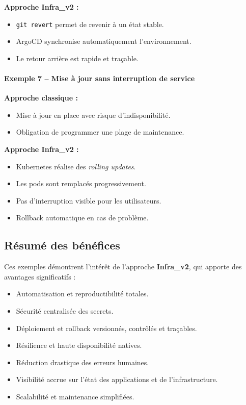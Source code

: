 \textbf{Approche Infra\_v2 :}
\begin{itemize}
	\item \texttt{git revert} permet de revenir à un état stable.
	\item ArgoCD synchronise automatiquement l’environnement.
	\item Le retour arrière est rapide et traçable.
\end{itemize}

\paragraph{Exemple 7 -- Mise à jour sans interruption de service}

\textbf{Approche classique :}
\begin{itemize}
	\item Mise à jour en place avec risque d’indisponibilité.
	\item Obligation de programmer une plage de maintenance.
\end{itemize}

\textbf{Approche Infra\_v2 :}
\begin{itemize}
	\item Kubernetes réalise des \emph{rolling updates}.
	\item Les pods sont remplacés progressivement.
	\item Pas d’interruption visible pour les utilisateurs.
	\item Rollback automatique en cas de problème.
\end{itemize}

\subsection*{Résumé des bénéfices}

Ces exemples démontrent l’intérêt de l’approche \textbf{Infra\_v2}, qui apporte des avantages significatifs :

\begin{itemize}
	\item Automatisation et reproductibilité totales.
	\item Sécurité centralisée des secrets.
	\item Déploiement et rollback versionnés, contrôlés et traçables.
	\item Résilience et haute disponibilité natives.
	\item Réduction drastique des erreurs humaines.
	\item Visibilité accrue sur l’état des applications et de l’infrastructure.
	\item Scalabilité et maintenance simplifiées.
\end{itemize}


